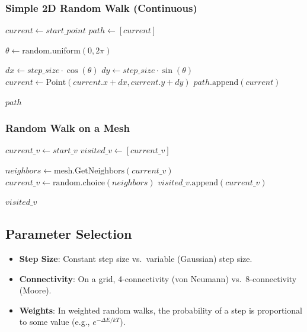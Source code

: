 \subsubsection{Simple 2D Random Walk (Continuous)}
\begin{algorithm}
\caption{2D Random Walk}\label{alg:random_walk_2d}
\begin{algorithmic}
    \State $current \gets start\_point$
    \State $path \gets [current]$

        \State $\theta \gets \text{random.uniform}(0, 2\pi)$

        \State $dx \gets step\_size \cdot \cos(\theta)$
        \State $dy \gets step\_size \cdot \sin(\theta)$
        \State $current \gets \text{Point}(current.x + dx, current.y + dy)$
        \State $path.\text{append}(current)$
    \EndFor

    \Return $path$
\EndFunction
\end{algorithmic}
\end{algorithm}

\subsubsection{Random Walk on a Mesh}
\begin{algorithm}
\caption{Random Walk on a Mesh}\label{alg:mesh_random_walk}
\begin{algorithmic}
    \State $current\_v \gets start\_v$
    \State $visited\_v \gets [current\_v]$

        \State $neighbors \gets \text{mesh.GetNeighbors}(current\_v)$
        \State $current\_v \gets \text{random.choice}(neighbors)$
        \State $visited\_v.\text{append}(current\_v)$
    \EndFor

    \Return $visited\_v$
\EndFunction
\end{algorithmic}
\end{algorithm}

\subsection{Parameter Selection}
\begin{itemize}
    \item \textbf{Step Size}: Constant step size vs.\ variable (Gaussian) step size.
    \item \textbf{Connectivity}: On a grid, 4-connectivity (von Neumann) vs.\ 8-connectivity (Moore).
    \item \textbf{Weights}: In weighted random walks, the probability of a step is proportional to some value (e.g., $e^{-\Delta E / kT}$).
\end{itemize}

